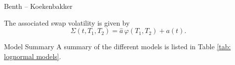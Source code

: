 {Benth -- Koekenbakker}


The associated swap volatility is given by
\begin{equation}
\Sigma(t,T_1,T_2)=\hat{a}\, \varphi(T_1,T_2) +a(t).
\end{equation}





{Model Summary}
A summary of the different models  is listed in Table \ref{tab: lognormal models}.
\begin{table}[h]
 \small {}
    \caption[Swap Volatility Models]
    {\small The associated swap volatility models generated by (\ref{eqn: swap volatility creation}) with $a \ge 0, b > 0$ and $0 \le c \le 1$ constants, $a(t)$ defined in (\ref{seasonality function}) and $\varphi(T_1,T_2)$ is given by (\ref{volatility function varphi}). }
    \label{tab: lognormal models}
\end{table}




